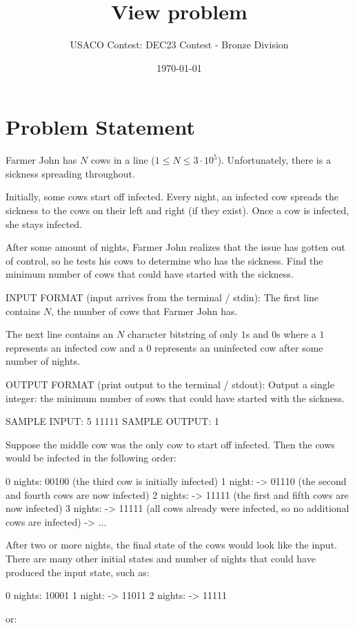 \documentclass[12pt]{article}
\title{View problem}
\author{USACO Contest: DEC23 Contest - Bronze Division}
\date{\today}
\begin{document}
\maketitle

\section*{Problem Statement}


Farmer John has $N$ cows in a line ($1 \leq N \leq 3\cdot 10^5$). Unfortunately,
there is a sickness spreading throughout. 

Initially, some cows start off infected. Every night, an infected cow spreads
the sickness to the cows on their left and right (if they exist). Once a cow is
infected, she stays infected.

After some amount of nights, Farmer John realizes that the issue has gotten out
of control, so he tests his cows to determine who has the sickness. Find the
minimum number of cows that could have started with the sickness. 

INPUT FORMAT (input arrives from the terminal / stdin):
The first line contains $N$, the number of cows that Farmer John has.

The next line contains an $N$ character bitstring of only $1$s and $0$s where a
$1$ represents an infected cow and a $0$ represents an uninfected cow after some
number of nights.

OUTPUT FORMAT (print output to the terminal / stdout):
Output a single integer: the minimum number of cows that could have started 
with the sickness.

SAMPLE INPUT:
5
11111
SAMPLE OUTPUT: 
1

Suppose the middle cow was the only cow to start off infected. Then the cows 
would be infected in the following order:


0 nights:    00100 (the third cow is initially infected)
1 night:  -> 01110 (the second and fourth cows are now infected)
2 nights: -> 11111 (the first and fifth cows are now infected)
3 nights: -> 11111 (all cows already were infected, so no additional cows are infected)
          -> ...

After two or more nights, the final state of the cows would look like the input.
There are many other initial states and number of nights that could have
produced the input state, such as:


0 nights:    10001
1 night:  -> 11011
2 nights: -> 11111

or:
\end{document}
